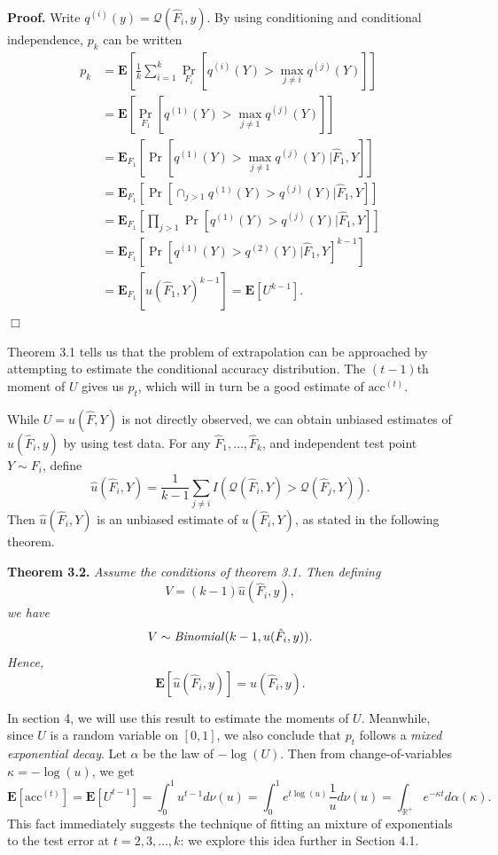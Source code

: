 \documentclass{article}
\newcommand{\E}{\textbf{E}}
\begin{document}
\noindent\textbf{Proof.}  
Write $q^{(i)}(y) = \mathcal{Q}(\hat{F}_i, y)$.
By using conditioning and
conditional independence, $p_k$ can be written
\begin{align*}
p_k &= \E\left[ \frac{1}{k}\sum_{i=1}^k  \Pr_{F_i}[q^{(i)}(Y) > \max_{j\neq i} q^{(j)}(Y)] \right]
\\&= \E\left[ \Pr_{F_1}[q^{(1)}(Y) > \max_{j\neq 1} q^{(j)}(Y)] \right]
\\&= \E_{F_1}[\Pr[q^{(1)}(Y) > \max_{j\neq 1} q^{(j)}(Y)|\hat{F}_1, Y]]
\\&= \E_{F_1}[\Pr[\cap_{j > 1} q^{(1)}(Y) > q^{(j)}(Y)|\hat{F}_1, Y]]
\\&= \E_{F_1}[\prod_{j > 1}\Pr[q^{(1)}(Y) > q^{(j)}(Y)|\hat{F}_1, Y]]
\\&= \E_{F_1}[\Pr[q^{(1)}(Y) > q^{(2)}(Y)|\hat{F}_1, Y]^{k-1}]
\\&= \E_{F_1}[u(\hat{F}_1, Y)^{k-1}] = \E[U^{k-1}].
\end{align*}
$\Box$

Theorem 3.1 tells us that the problem of extrapolation can be
approached by attempting to estimate the conditional accuracy
distribution.  The $(t-1)$th moment of $U$ gives us $p_t$, which will
in turn be a good estimate of $\text{acc}^{(t)}$.

While $U = u(\hat{F}, Y)$ is not directly observed, we can obtain unbiased estimates of $u(\hat{F}_i, y)$
by using test data.  For any $\hat{F}_1,\hdots, \hat{F}_k$, and independent test point $Y \sim F_i$, define
\begin{equation}\label{eq:hatu}
\hat{u}(\hat{F}_i, Y) = \frac{1}{k -1}\sum_{j \neq i} I(\mathcal{Q}(\hat{F}_i, Y) > \mathcal{Q}(\hat{F}_j, Y)).
\end{equation}
Then $\hat{u}(\hat{F}_i, Y)$ is an unbiased estimate of $u(\hat{F}_i, Y)$, as stated in the following theorem.

\noindent\textbf{Theorem 3.2.}\emph{
Assume the conditions of theorem 3.1.
Then defining 
\begin{equation}\label{eq:veq}
V = (k-1)\hat{u}(\hat{F}_i, y),\end{equation}
we have
\[V \sim \text{\emph{Binomial}}(k-1, u(\hat{F}_i, y)).\]
Hence,
\[\E[\hat{u}(\hat{F}_i, y)] = u(\hat{F}_i, y).\]
}

In section 4, we will use this result to estimate the moments of $U$.
Meanwhile, since $U$ is a random variable on $[0, 1]$, we also conclude that $p_t$ follows a \emph{mixed exponential decay}.
Let $\alpha$ be the law of $-\log(U)$.
Then from change-of-variables $\kappa =-\log(u)$, we get
\[\E[\text{acc}^{(t)}] = \E[U^{t-1}] = 
\int_0^1 u^{t-1} d\nu(u) = \int_0^1 e^{t\log(u)} \frac{1}{u}d\nu(u) = 
\int_{\mathbb{R}^{+}} e^{-\kappa t} d\alpha(\kappa).\]
This fact immediately suggests the technique of fitting an mixture of exponentials to the test error at $t =2,3,\hdots, k$:
we explore this idea further in Section 4.1.
\end{document}
